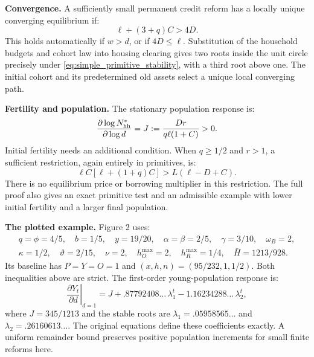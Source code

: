 \documentclass[11pt]{article}
\begin{document}
\textbf{Convergence.} A sufficiently small permanent credit reform has a
locally unique converging equilibrium if:
\begin{equation}
 \ell+(3+q)C>4D.
 \label{eq:simple_primitive_stability}
\end{equation}
This holds automatically if $w>d$, or if $4D\le\ell$. Substitution of the
household budgets and cohort law into housing clearing gives two roots inside
the unit circle precisely under \eqref{eq:simple_primitive_stability}, with a
third root above one. The initial cohort and its predetermined old assets
select a unique local converging path.

\textbf{Fertility and population.} The stationary population response is:
\begin{equation}
 \frac{\partial\log N_{\rm hh}^*}{\partial\log d}
 =J:=\frac{Dr}{q\ell(1+C)}>0.
 \label{eq:simple_local_ss}
\end{equation}
Initial fertility needs an additional condition. When $q\ge1/2$ and $r>1$,
a sufficient restriction, again entirely in primitives, is:
\begin{equation}
 \ell C[\ell+(1+q)C]>L(\ell-D+C).
 \label{eq:simple_primitive_initial_fertility}
\end{equation}
There is no equilibrium price or borrowing multiplier in this restriction.
The full proof also gives an exact primitive test and an admissible example
with lower initial fertility and a larger final population.

\textbf{The plotted example.} Figure 2 uses:
\begin{gather*}
 q=\phi=4/5,\quad b=1/5,\quad y=19/20,\quad
 \alpha=\beta=2/5,\quad\gamma=3/10,\quad\omega_B=2,\\
 \kappa=1/2,\quad\vartheta=2/15,\quad\nu=2,\quad
 h_O^{\max}=2,\quad h_R^{\max}=1/4,\quad\bar H=1213/928.
\end{gather*}
Its baseline has $P=Y=O=1$ and $(x,h,n)=(95/232,1,1/2)$. Both inequalities
above are strict. The first-order young-population response is:
\begin{equation}
 \left.\frac{\partial Y_t}{\partial d}\right|_{d=1}
 =J+.87792408\ldots\,\lambda_1^t-1.16234288\ldots\,\lambda_2^t,
 \label{eq:simple_analytical_path}
\end{equation}
where $J=345/1213$ and the stable roots are
$\lambda_1=.05958565\ldots$ and $\lambda_2=.26160613\ldots$.
The original equations define these coefficients exactly. A uniform remainder
bound preserves positive population increments for small finite reforms here.
\end{document}
